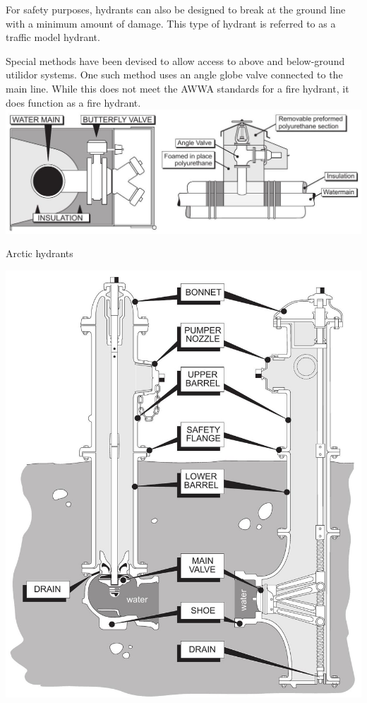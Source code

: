 \documentclass[10pt]{article}
\begin{document}
For safety purposes, hydrants can also be designed to break at the ground line with a minimum amount of damage. This type of hydrant is referred to as a traffic model hydrant.

Special methods have been devised to allow access to above and below-ground utilidor systems. One such method uses an angle globe valve connected to the main line. While this does not meet the AWWA standards for a fire hydrant, it does function as a fire hydrant.\\

\includegraphics[max width=\textwidth]{2022_11_03_fc0cbc2f3612fab6edd2g-22(1)}

Arctic hydrants

\includegraphics[max width=\textwidth]{2022_11_03_fc0cbc2f3612fab6edd2g-23}
\end{document}
